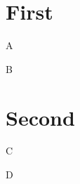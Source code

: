 \documentclass{article}
\begin{document}
\section{First}
\begin{theorem}\label{thm1} A \end{theorem}
\begin{definition}\label{def1} B \end{definition}

\section{Second}
\begin{theorem}\label{thm2} C \end{theorem}
\begin{definition}\label{def2} D \end{definition}
\end{document}
